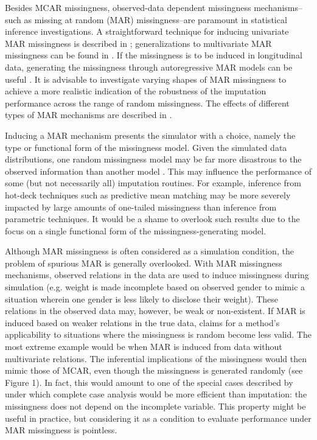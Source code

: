 \documentclass[bimj,fleqn]{w-art}
\begin{document}
Besides MCAR missingness, observed-data dependent missingness mechanisms--such as missing at random (MAR) missingness--are paramount in statistical inference investigations. A straightforward technique for inducing univariate MAR missingness is described in \citet[][\S 3.2.4]{buur18}; generalizations to multivariate MAR missingness can be found in \citet{ampute}. If the missingness is to be induced in longitudinal data, generating the missingness through autoregressive MAR models can be useful \citep[see e.g.][model 2 and model 3]{shara2015randomly}. It is advisable to investigate varying shapes of MAR missingness to achieve a more realistic indication of the robustness of the imputation performance across the range of random missingness. The effects of different types of MAR mechanisms are described in \citet{scho18}. 

Inducing a MAR mechanism presents the simulator with a choice, namely the type or functional form of the missingness model. Given the simulated data distributions, one random missingness model may be far more disastrous to the observed information than another model \citep{scho18}. This may influence the performance of some (but not necessarily all) imputation routines. For example, inference from hot-deck techniques such as predictive mean matching \citep{little1988missing, rubin1986statistical} may be more severely impacted by large amounts of one-tailed missingness than inference from parametric techniques. It would be a shame to overlook such results due to the focus on a single functional form of the missingness-generating model.

Although MAR missingness is often considered as a simulation condition, the problem of spurious MAR is generally overlooked. With MAR missingness mechanisms, observed relations in the data are used to induce missingness during simulation (e.g. weight is made incomplete based on observed gender to mimic a situation wherein one gender is less likely to disclose their weight). These relations in the observed data may, however, be weak or non-existent. If MAR is induced based on weaker relations in the true data, claims for a method's applicability to situations where the missingness is random become less valid. The most extreme example would be when MAR is induced from data without multivariate relations. The inferential implications of the missingness would then mimic those of MCAR, even though the missingness is generated randomly (see Figure 1). In fact, this would amount to one of the special cases described by \citet{buur18} under which complete case analysis would be more efficient than imputation: the missingness does not depend on the incomplete variable. This property might be useful in practice, but considering it as a condition to evaluate performance under MAR missingness is pointless. 
\end{document}
